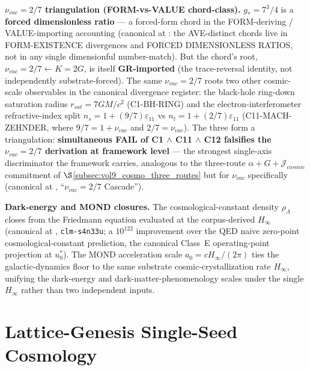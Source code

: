 

\textbf{$\nu_{vac} = 2/7$ triangulation (FORM-vs-VALUE chord-class).} $g_* = 7^3/4$ is a \textbf{forced dimensionless ratio} --- a forced-form chord in the FORM-deriving / VALUE-importing accounting (canonical at : the AVE-distinct chords live in FORM-EXISTENCE divergences and FORCED DIMENSIONLESS RATIOS, not in any single dimensionful number-match). But the chord's root, $\nu_{vac} = 2/7 \leftarrow K = 2G$, is itself \textbf{GR-imported} (the trace-reversal identity, not independently substrate-forced). The same $\nu_{vac} = 2/7$ roots two other cosmic-scale observables in the canonical divergence register: the black-hole ring-down saturation radius $r_{sat} = 7GM/c^2$ (C1-BH-RING) and the electron-interferometer refractive-index split $n_s = 1 + (9/7)\varepsilon_{11}$ vs $n_t = 1 + (2/7)\varepsilon_{11}$ (C11-MACH-ZEHNDER, where $9/7 = 1 + \nu_{vac}$ and $2/7 = \nu_{vac}$). The three form a triangulation: \textbf{simultaneous FAIL of C1 $\wedge$ C11 $\wedge$ C12 falsifies the $\nu_{vac} = 2/7$ derivation at framework level} --- the strongest single-axis discriminator the framework carries, analogous to the three-route $\alpha + G + \mathcal{J}_{cosmic}$ commitment of $\S$\ref{subsec:vol9_cosmo_three_routes} but for $\nu_{vac}$ specifically (canonical at , ``$\nu_{vac} = 2/7$ Cascade'').

\textbf{Dark-energy and MOND closures.} The cosmological-constant density $\rho_\Lambda$ closes from the Friedmann equation evaluated at the corpus-derived $H_\infty$ (canonical at , \texttt{clm-s4n33u}; a $10^{122}$ improvement over the QED naive zero-point cosmological-constant prediction, the canonical Class~E operating-point projection at $u_0^*$). The MOND acceleration scale $a_0 = c H_\infty / (2\pi)$ ties the galactic-dynamics floor to the same substrate cosmic-crystallization rate $H_\infty$, unifying the dark-energy and dark-matter-phenomenology scales under the single $H_\infty$ rather than two independent inputs.

\section{Lattice-Genesis Single-Seed Cosmology}
\label{sec:vol9_cosmo_lattice_genesis}

